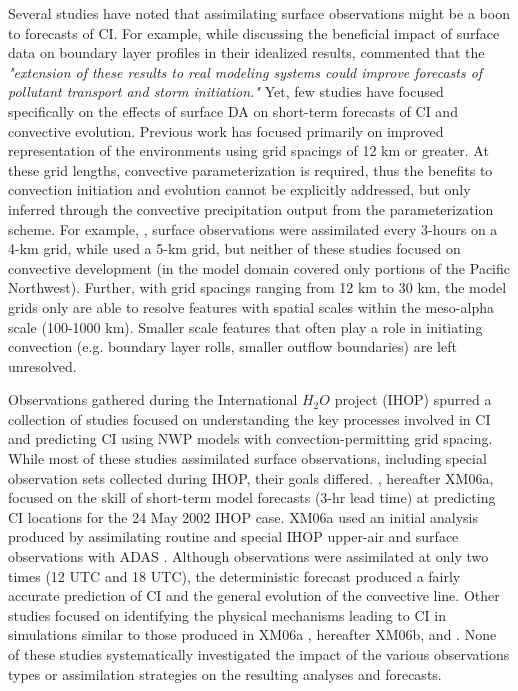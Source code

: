 Several studies have noted that assimilating surface observations might be a boon to forecasts of CI. For example, while discussing the beneficial impact of surface data on boundary layer profiles in their idealized results, \citet{hackersnyder05} commented that the {\it "extension of these results to real modeling systems could improve forecasts of pollutant transport and storm initiation."} Yet, few studies have focused specifically on the effects of surface DA on short-term forecasts of CI and convective evolution. Previous work has focused primarily on improved representation of the environments using grid spacings of 12 km or greater. At these grid lengths, convective parameterization is required, thus the benefits to convection initiation and evolution cannot be explicitly addressed, but only inferred through the convective precipitation output from the parameterization scheme. For example, \citet{ancell12}, surface observations were assimilated every 3-hours on a 4-km grid, while \citet{knopfmeierstensrud13} used a 5-km grid, but neither of these studies focused on convective development (in \citealt{ancell12} the model domain covered only portions of the Pacific Northwest). Further, with grid spacings ranging from 12 km to 30 km, the model grids only are able to resolve features with spatial scales within the meso-alpha scale (100-1000 km). Smaller scale features that often play a role in initiating convection (e.g. boundary layer rolls, smaller outflow boundaries) are left unresolved.

Observations gathered during the International \(H_2O\) project (IHOP) spurred a collection of studies focused on understanding the key processes involved in CI and predicting CI using NWP models with convection-permitting grid spacing. While most of these studies assimilated surface observations, including special observation sets collected during IHOP, their goals differed. \citet{xuemartin06a}, hereafter XM06a, focused on the skill of short-term model forecasts (3-hr lead time) at predicting CI locations for the 24 May 2002 IHOP case. XM06a used an initial analysis produced by assimilating routine and special IHOP upper-air and surface observations with ADAS \citep{brewster96}. Although observations were assimilated at only two times (12 UTC and 18 UTC), the deterministic forecast produced a fairly accurate prediction of CI and the general evolution of the convective line. Other studies focused on identifying the physical mechanisms leading to CI in simulations similar to those produced in XM06a \citep{xuemartin06b}, hereafter XM06b, and \citet{wangxue12}. None of these studies systematically investigated the impact of the various observations types or assimilation strategies on the resulting analyses and forecasts. 

